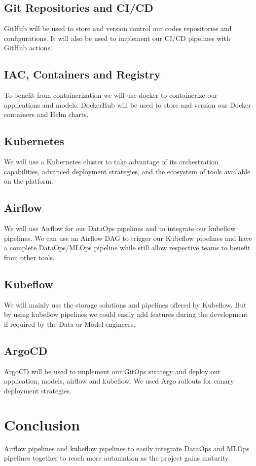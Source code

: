 \subsection{Git Repositories and CI/CD}\label{subsec:github}
GitHub will be used to store and version control our codes repositories and configurations.
It will also be used to implement our CI/CD pipelines with GitHub actions.

\subsection{IAC, Containers and Registry}\label{subsec:dockerhub}
To benefit from containerization we will use docker to containerize our applications and models.
DockerHub will be used to store and version our Docker containers and Helm charts.

\subsection{Kubernetes}\label{subsec:kubernetes}
We will use a Kubernetes cluster to take advantage of its orchestration capabilities, advanced deployment strategies,
and the ecosystem of tools available on the platform.

\subsection{Airflow}\label{subsec:airflow}
We will use Airflow for our DataOps pipelines and to integrate our kubeflow pipelines.
We can use an Airflow DAG to trigger our Kubeflow pipelines and have a complete DataOps/MLOps pipeline while still allow respective teams
to benefit from other tools.

\subsection{Kubeflow}\label{subsec:kubeflow}
We will mainly use the storage solutions and pipelines offered by Kubeflow.
But by using kubeflow pipelines we could easily add features during the development if required by the Data or Model engineers.

\subsection{ArgoCD}\label{subsec:argocd}
ArgoCD will be used to implement our GitOps strategy and deploy our application, models, airflow and kubeflow.
We used Argo rollouts for canary deployment strategies.






\section{Conclusion}\label{sec:conclusion}
Airflow pipelines and kubeflow pipelines to easily integrate DataOps and MLOps pipelines together to reach more automation as the project gains maturity.
